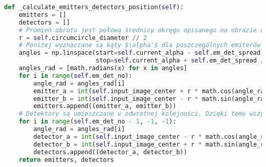 \documentclass[a4paper]{article}
\begin{document}
\begin{lstlisting}[language=Python, caption=Wyznaczanie położenia emiterów i detektorów, texcl=true]
def _calculate_emitters_detectors_position(self):
    emitters = []
    detectors = []
    # Promień obrotu jest połową średnicy okręgu opisanego na obrazie wejściowym
    r = self.circumcircle_diameter // 2
    # Poniżej wyznaczane są kąty $\alpha'$ dla poszczególnych emiterów i detektorów. Gdy wartość kąta $\alpha'$ emitera zmienimy o pewną wartość $x$, a detektora o wartość $-x$, uzyskamy efekt przesunięcia łączącej je linii względem środka okręgu, jednocześnie nie zmieniając nachylenia tej linii
    angles = np.linspace(start=self.current_alpha - self.em_det_spread / 2,
                         stop=self.current_alpha + self.em_det_spread / 2, num=self.em_det_no)
    angles_rad = [math.radians(x) for x in angles]
    for i in range(self.em_det_no):
        angle_rad = angles_rad[i]
        emitter_a = int(self.input_image_center + r * math.cos(angle_rad))
        emitter_b = int(self.input_image_center - r * math.sin(angle_rad))
        emitters.append((emitter_a, emitter_b))
    # Detektory są umieszczane w odwrotnej kolejności. Dzięki temu wszystkie linie łączące odpowiadające sobie emitery i detektory będą (w danej iteracji) tak samo nachylone
    for i in range(self.em_det_no - 1, -1, -1):
        angle_rad = angles_rad[i]
        detector_a = int(self.input_image_center - r * math.cos(angle_rad))
        detector_b = int(self.input_image_center + r * math.sin(angle_rad))
        detectors.append((detector_a, detector_b))
    return emitters, detectors
\end{lstlisting}
\end{document}
